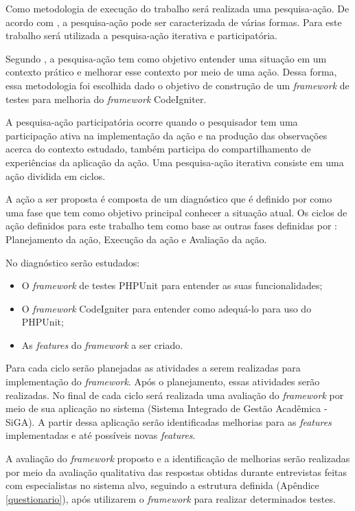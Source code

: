 Como metodologia de execução do trabalho será realizada uma pesquisa-ação. De acordo com , 
a pesquisa-ação pode ser caracterizada de várias formas. Para este trabalho será utilizada a pesquisa-ação iterativa e participatória.

Segundo , a pesquisa-ação tem como objetivo entender uma situação em um contexto prático e melhorar esse contexto por meio de uma ação.
Dessa forma, essa metodologia foi escolhida dado o objetivo de construção de um \textit{framework} de testes para melhoria do \textit{framework} CodeIgniter.

A pesquisa-ação participatória ocorre quando o pesquisador tem uma participação ativa na implementação da ação e na produção das observações acerca do contexto estudado, também participa do compartilhamento de experiências da aplicação da ação. Uma pesquisa-ação iterativa consiste em uma ação dividida em ciclos. \cite{artigo_pesquisa_acao}

A ação a ser proposta é composta de um diagnóstico que é definido por  como uma fase que tem como objetivo principal conhecer a situação atual. Os ciclos de ação definidos para este trabalho tem como base as outras fases definidas por : Planejamento da ação, Execução da ação e Avaliação da ação.

No diagnóstico serão estudados:
	\begin{itemize}
		\item O \textit{framework} de testes PHPUnit para entender as suas funcionalidades;
		\item O \textit{framework} CodeIgniter para entender como adequá-lo para uso do PHPUnit;
		\item As \textit{features} do \textit{framework} a ser criado.
	\end{itemize}

Para cada ciclo serão planejadas as atividades a serem realizadas para implementação do \textit{framework}.
Após o planejamento, essas atividades serão realizadas.
No final de cada ciclo será realizada uma avaliação do \textit{framework} por meio
de sua aplicação no sistema (Sistema Integrado de Gestão Acadêmica - SiGA). A partir dessa aplicação serão identificadas
melhorias para as \textit{features} implementadas e até possíveis novas \textit{features}. 

A avaliação do \textit{framework} proposto e a identificação de melhorias serão realizadas por meio da avaliação qualitativa 
das respostas obtidas durante entrevistas feitas com especialistas no sistema alvo, seguindo a estrutura definida (Apêndice \ref{questionario}), após utilizarem o \textit{framework} para realizar determinados testes.
